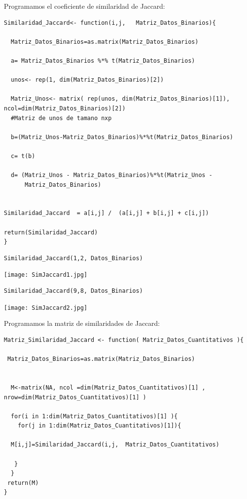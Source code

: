 \documentclass[12pt]{report} %
\begin{document}
Programamos el coeficiente de similaridad de Jaccard:
\begin{lstlisting}
Similaridad_Jaccard<- function(i,j,   Matriz_Datos_Binarios){
  
  Matriz_Datos_Binarios=as.matrix(Matriz_Datos_Binarios)
  
  a= Matriz_Datos_Binarios %*% t(Matriz_Datos_Binarios)
  
  unos<- rep(1, dim(Matriz_Datos_Binarios)[2])

  Matriz_Unos<- matrix( rep(unos, dim(Matriz_Datos_Binarios)[1]), ncol=dim(Matriz_Datos_Binarios)[2]) 
  #Matriz de unos de tamano nxp

  b=(Matriz_Unos-Matriz_Datos_Binarios)%*%t(Matriz_Datos_Binarios)
  
  c= t(b)
  
  d= (Matriz_Unos - Matriz_Datos_Binarios)%*%t(Matriz_Unos -     
      Matriz_Datos_Binarios) 


Similaridad_Jaccard  = a[i,j] /  (a[i,j] + b[i,j] + c[i,j])
  
return(Similaridad_Jaccard)
}
\end{lstlisting}

\begin{lstlisting}
Similaridad_Jaccard(1,2, Datos_Binarios)
\end{lstlisting}

\texttt{[image: SimJaccard1.jpg]}

\begin{lstlisting}
Similaridad_Jaccard(9,8, Datos_Binarios)
\end{lstlisting}

\texttt{[image: SimJaccard2.jpg]}


\newpage

Programamos la matriz de similaridades de Jaccard:
\begin{lstlisting}
Matriz_Similaridad_Jaccard <- function( Matriz_Datos_Cuantitativos ){
  
 Matriz_Datos_Binarios=as.matrix(Matriz_Datos_Binarios)

  
  M<-matrix(NA, ncol =dim(Matriz_Datos_Cuantitativos)[1] , nrow=dim(Matriz_Datos_Cuantitativos)[1] )
  
  for(i in 1:dim(Matriz_Datos_Cuantitativos)[1] ){
    for(j in 1:dim(Matriz_Datos_Cuantitativos)[1]){
    
  M[i,j]=Similaridad_Jaccard(i,j,  Matriz_Datos_Cuantitativos)
  
   }
  }
 return(M)
}
\end{lstlisting}
\end{document}
